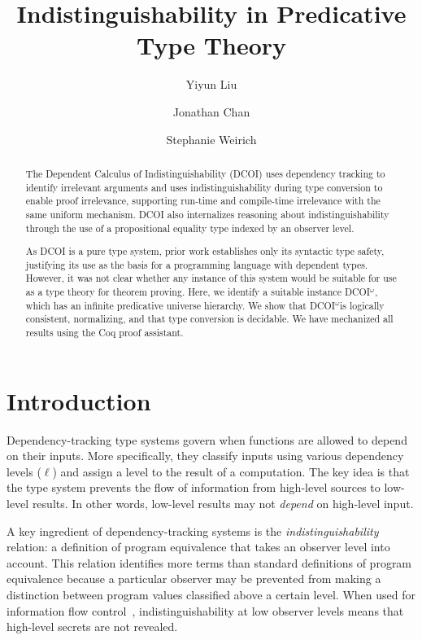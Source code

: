 \documentclass[acmsmall, screen=true, nonacm=true,
  review=\ifpublic false\else true\fi,
  anonymous=\ifanonymous true\else false\fi
]{acmart}
\title{Indistinguishability in Predicative Type Theory}
\author{Yiyun Liu}
\affiliation{%
  \institution{University of Pennsylvania}
  \city{Philadelphia}
  \country{USA}
}
\author{Jonathan Chan}
\affiliation{%
  \institution{University of Pennsylvania}
  \city{Philadelphia}
  \country{USA}
}
\author{Stephanie Weirich}
\affiliation{%
  \institution{University of Pennsylvania}
  \city{Philadelphia}
  \country{USA}
}
\makeatletter
\newcommand{\sw}[1]{}
\newcommand{\dcoi}{DCOI\@\xspace}
\newcommand{\name}{\texorpdfstring{DCOI$^{\omega}$\@\xspace}{DCOI-omega}}
\makeatother
\begin{document}
\setlength{\jot}{0pt}

\begin{abstract}
  The Dependent Calculus of Indistinguishability (\dcoi) uses dependency
  tracking to identify irrelevant arguments and uses indistinguishability
  during type conversion to enable proof irrelevance, supporting run-time and
  compile-time irrelevance with the same uniform mechanism. \dcoi also 
  internalizes reasoning about indistinguishability through the use of a
  propositional equality type indexed by an observer level.

  As \dcoi is a pure type system, prior work establishes only its syntactic
  type safety, justifying its use as the basis for a programming language with
  dependent types.  However, it was not clear whether any instance of this
  system would be suitable for use as a type theory for theorem proving.
  Here, we identify a suitable instance \name, which has an infinite
  predicative universe hierarchy. We show that \name is logically consistent,
  normalizing, and that type conversion is decidable. We have
  mechanized all results using the Coq proof assistant.  \sw{I don't think we
    need to go into details about our proof technique.}
\end{abstract}

\maketitle

\section{Introduction}

Dependency-tracking type systems govern when functions are allowed to depend
on their inputs. More specifically, they classify inputs using various
dependency levels ($\ell$) and assign a level to the result of a
computation. The key idea is that the type system prevents the flow of
information from high-level sources to low-level results. In other words,
low-level results may not \emph{depend} on high-level input.

A key ingredient of dependency-tracking systems is the
\emph{indistinguishability} relation: a definition of program equivalence that
takes an observer level into account. This relation identifies more terms
than standard definitions of program equivalence because a particular
observer may be prevented from making a distinction between program values
classified above a certain level. When used for information flow
control~\cite{abadi:dcc}, indistinguishability at low observer levels means
that high-level secrets are not revealed.
\end{document}
